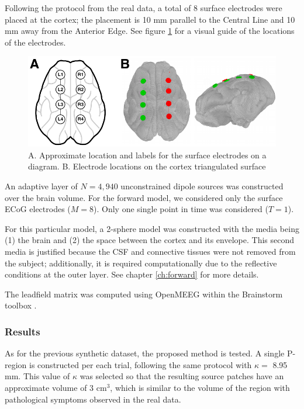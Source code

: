 Following the protocol from the real data, a total of 8 surface electrodes were placed at the cortex; the placement is 10 mm parallel to the Central Line and 10 mm away from the Anterior Edge.
%
See figure \ref{fig:pig_elecs} for a visual guide of the locations of the electrodes.

\begin{figure}
\centering
\includegraphics{./img/electrodes_pig.pdf}
\caption{A. Approximate location and labels for the surface electrodes on a diagram. B. Electrode locations on the cortex triangulated surface}
\label{fig:pig_elecs}
\end{figure}

An adaptive layer of $N=4,940$ unconstrained dipole sources was constructed over the brain volume.
%
For the forward model, we considered only the surface ECoG electrodes ($M=8$).
%
Only one single point in time was considered ($T=1$).

For this particular model, a 2-sphere model was constructed with the media being (1) the brain and (2) the space between the cortex and its envelope.
%
This second media is justified because the CSF and connective tissues were not removed from the subject; additionally, it is required computationally due to the reflective conditions at the outer layer.
%
See chapter \ref{ch:forward} for more details.

The leadfield matrix was computed using OpenMEEG \cite{gramfort2010openmeeg} within the Brainstorm toolbox \cite{brainstorm}.

\subsubsection{Results}

As for the previous synthetic dataset, the proposed method is tested.
%
A single P-region is constructed per each trial, following the same protocol with $\kappa =$ 8.95 mm.
%
This value of $\kappa$ was selected so that the resulting source patches have an approximate volume of 3 $\text{cm}^3$, which is similar to the volume of the region with pathological symptoms observed in the real data.

